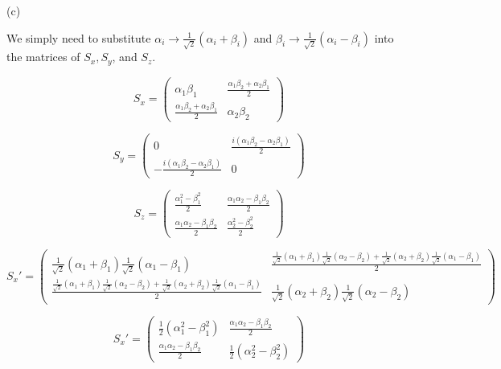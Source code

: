 \documentclass[12pt]{article}
\begin{document}
(c)

We simply need to substitute \(\alpha_i \rightarrow \frac{1}{\sqrt{2}}(\alpha_i + \beta_i)\) and \(\beta_i \rightarrow \frac{1}{\sqrt{2}}(\alpha_i - \beta_i)\) into the matrices of \(S_x, S_y\), and \(S_z\).

\[
    S_x =
    \begin{pmatrix}
        \alpha_1\beta_1                             & \frac{\alpha_1\beta_2 + \alpha_2\beta_1}{2} \\
        \frac{\alpha_1\beta_2 + \alpha_2\beta_1}{2} & \alpha_2\beta_2
    \end{pmatrix}
\]

\[
    S_y =
    \begin{pmatrix}
        0                                               & \frac{i(\alpha_1\beta_2 - \alpha_2\beta_1)}{2} \\
        -\frac{i(\alpha_1\beta_2 - \alpha_2\beta_1)}{2} & 0
    \end{pmatrix}
\]

\[
    S_z =
    \begin{pmatrix}
        \frac{\alpha_1^2 - \beta_1^2}{2}          & \frac{\alpha_1\alpha_2-\beta_1\beta_2}{2} \\
        \frac{\alpha_1\alpha_2-\beta_1\beta_2}{2} & \frac{\alpha_2^2 - \beta_2^2}{2}
    \end{pmatrix}
\]

\[
    {S_x}' =
    \begin{pmatrix}
        \frac{1}{\sqrt{2}}(\alpha_1 + \beta_1)\frac{1}{\sqrt{2}}(\alpha_1 - \beta_1)                                                                                          & \frac{\frac{1}{\sqrt{2}}(\alpha_1 + \beta_1)\frac{1}{\sqrt{2}}(\alpha_2 - \beta_2) + \frac{1}{\sqrt{2}}(\alpha_2 + \beta_2)\frac{1}{\sqrt{2}}(\alpha_1 - \beta_1)}{2} \\
        \frac{\frac{1}{\sqrt{2}}(\alpha_1 + \beta_1)\frac{1}{\sqrt{2}}(\alpha_2 - \beta_2) + \frac{1}{\sqrt{2}}(\alpha_2 + \beta_2)\frac{1}{\sqrt{2}}(\alpha_1 - \beta_1)}{2} & \frac{1}{\sqrt{2}}(\alpha_2 + \beta_2)\frac{1}{\sqrt{2}}(\alpha_2 - \beta_2)
    \end{pmatrix}
\]

\[
    {S_x}' =
    \begin{pmatrix}
        \frac{1}{2}(\alpha_1^2 - \beta_1^2)         & \frac{\alpha_1\alpha_2 - \beta_1\beta_2}{2} \\
        \frac{\alpha_1\alpha_2 - \beta_1\beta_2}{2} & \frac{1}{2}(\alpha_2^2 - \beta_2^2)
    \end{pmatrix}
\]
\end{document}
